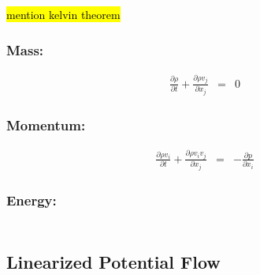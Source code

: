 \hl{mention kelvin theorem}

\subsubsection{Mass:}
\begin{eqnarray}        
    \frac{\partial \rho}{\partial t} +  \frac{\partial \rho v_j}{\partial x_j} &=& 0 
\end{eqnarray}        

\subsubsection{Momentum:}
\begin{eqnarray}        
    \frac{\partial \rho v_i}{\partial t} +  \frac{\partial \rho v_i v_j}{\partial x_j} &=& - \frac{\partial p}{\partial x_i} 
\end{eqnarray}        

\subsubsection{Energy:}
\begin{eqnarray}        
\end{eqnarray}        




\subsection{Linearized Potential Flow}








